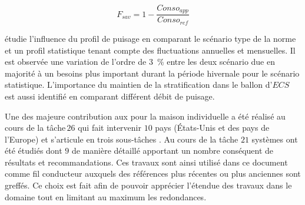\begin{equation}\label{eq:f_sav}
    F_{sav} = 1 - \frac{Conso_{app}}{Conso_{ref}}
\end{equation}

\textcite{Jordan2001197} étudie l’influence du profil de puisage en comparant le
scénario type de la norme  et un profil statistique tenant compte
des fluctuations annuelles et mensuelles. Il est observée une variation de l’ordre
de \SI{3}{\percent} entre les deux scénario due en majorité à un besoins plus
important durant la période hivernale pour le scénario statistique.
L’importance du maintien de la stratification dans le ballon d’$ECS$ est aussi identifié
en comparant différent débit de puisage.


Une des majeure contribution aux  pour la maison individuelle a été réalisé au cours
de la tâche\,$26$ qui fait intervenir $10$ pays (États-Unis et des pays de l’Europe)
et s’articule en trois sous-tâches \parencite{Task26C2003}. Au cours
de la tâche $21$ systèmes ont été étudiés dont $9$ de manière détaillé apportant
un nombre conséquent de résultats et recommandations.
Ces travaux sont ainsi utilisé dans ce document comme fil conducteur auxquels des
références plus récentes ou plus anciennes sont greffés. Ce choix est fait afin
de pouvoir apprécier l’étendue des travaux dans le domaine tout en limitant au
maximum les redondances.

